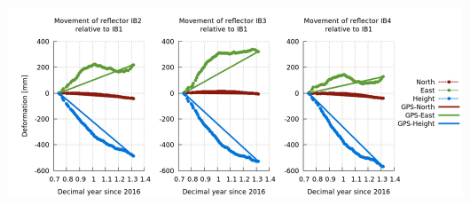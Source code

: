 \documentclass{beamer}
\begin{document}
\begin{frame}{\ft}
    \begin{center}
        \includegraphics[width=0.9\textwidth]{dszekcso_ts.png}
    \end{center}
\end{frame}
\end{document}
